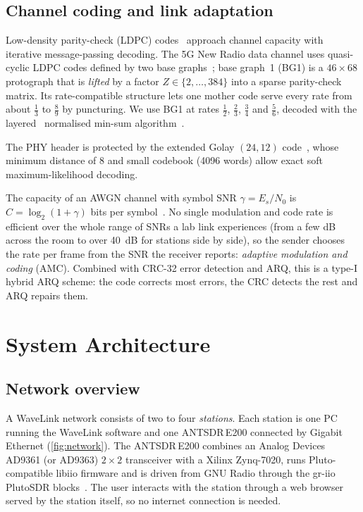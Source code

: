 \documentclass[11pt,a4paper,oneside]{report}
\begin{document}
\section{Channel coding and link adaptation}\label{sec:coding-bg}
Low-density parity-check (LDPC) codes~\cite{gallager1962} approach channel capacity with iterative
message-passing decoding. The 5G New Radio data channel uses quasi-cyclic LDPC codes defined by two
base graphs~\cite{ts38212,richardson2018}; base graph~1 (BG1) is a $46\times68$ protograph that is
\emph{lifted} by a factor $Z\in\{2,\ldots,384\}$ into a sparse parity-check matrix. Its
rate-compatible structure lets one mother code serve every rate from about $\tfrac13$ to
$\tfrac89$ by puncturing. We use BG1 at rates $\tfrac12$, $\tfrac23$, $\tfrac34$ and $\tfrac56$, decoded with
the layered~\cite{hocevar2004} normalised min-sum algorithm~\cite{chen2002}.

The PHY header is protected by the extended Golay $(24,12)$ code~\cite{golay1949,macwilliams1977},
whose minimum distance of 8 and small codebook (\num{4096} words) allow exact soft
maximum-likelihood decoding.

The capacity of an AWGN channel with symbol SNR $\gamma=E_s/N_0$ is $C=\log_2(1+\gamma)$ bits per
symbol~\cite{shannon1948}. No single modulation and code rate is efficient over the whole range of
SNRs a lab link experiences (from a few dB across the room to over \SI{40}{dB} for stations side by
side), so the sender chooses the rate per frame from the SNR the receiver reports: \emph{adaptive
modulation and coding} (AMC). Combined with CRC-32 error detection and ARQ, this is a type-I hybrid
ARQ scheme: the code corrects most errors, the CRC detects the rest and ARQ repairs them.

\chapter{System Architecture}\label{ch:arch}

\section{Network overview}
A WaveLink network consists of two to four \emph{stations}. Each station is one PC running the
WaveLink software and one ANTSDR\,E200 connected by Gigabit Ethernet (\cref{fig:network}). The
ANTSDR\,E200 combines an Analog Devices AD9361 (or AD9363) $2\times2$ transceiver with a Xilinx
Zynq-7020, runs Pluto-compatible libiio firmware and is driven from GNU Radio through the gr-iio
PlutoSDR blocks~\cite{antsdr,ad9361,libiio}. The user interacts with the station through a web
browser served by the station itself, so no internet connection is needed.
\end{document}
